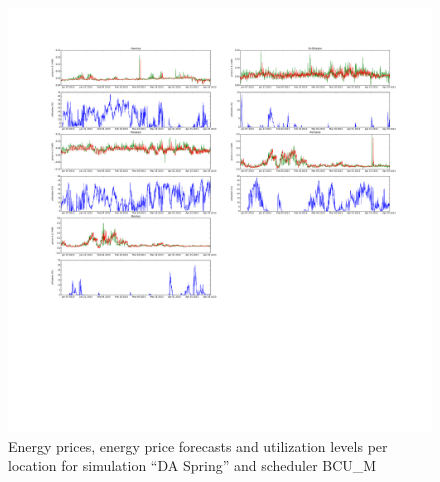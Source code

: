 \begin{figure}[htbp]
	\centering
	\vspace*{-0.6in}
	\hspace*{-1.4in}
		\includegraphics[width=1.60\textwidth]{figures/appendix_simulation_results/DA_Spring_scenario_5.pdf}
	\vspace*{-2.8in}
	\caption{Energy prices, energy price forecasts and utilization levels per location for simulation ``DA Spring'' and scheduler BCU\_M}
	\label{fig:app_DA_Spring_scenario_5}
\end{figure}

